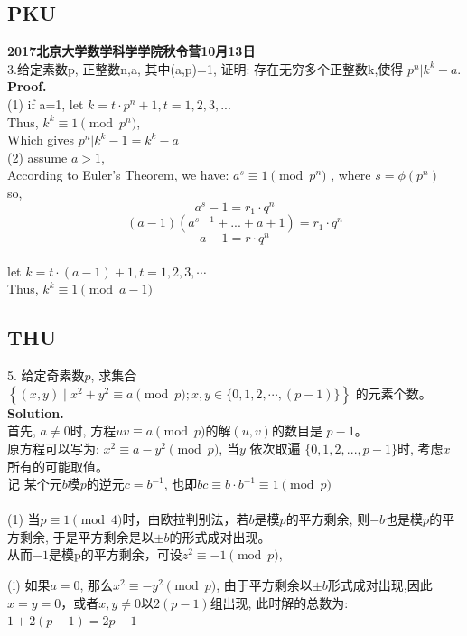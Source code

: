 \documentclass[11pt,a4paper]{article}
\begin{document}
\subsection{PKU}
\begin{CJK}{UTF8}{gbsn}
	
\textbf{2017北京大学数学科学学院秋令营10月13日}
\\
3.给定素数p, 正整数n,a, 其中(a,p)=1, 证明: 存在无穷多个正整数k,使得 $p^n|k^k-a$.\\
\textbf{Proof.}\\
(1) if a=1, let $k=t\cdot p^n + 1,t=1,2,3,...$\\
Thus, $k^k\equiv 1 \pmod{p^n}$,   \\
Which gives $p^n|k^k-1=k^k-a$  \\
(2) assume $a>1$, \\
According to Euler's Theorem, we have: $a^s \equiv 1 \pmod{p^n}$ , where $s=\phi{(p^n)}$\\
so, $$a^s-1 = r_1\cdot q^n$$
$$ (a-1)(a^{s-1}+...+a+1) = r_1\cdot q^n$$
$$a-1=r\cdot q^n$$
\\
let $k=t\cdot (a-1) + 1, t=1,2,3,\cdots $\\
Thus, $k^k \equiv 1 \pmod{a-1}$ \\
$$ $$
\newpage
\subsection{THU}
5. 给定奇素数$p$, 求集合$\left\{(x,y)\mid x^2+y^2 \equiv a \pmod{p}; x,y\in \{0,1,2,\cdots ,(p-1)\} \right\}$ 的元素个数。
\\
\textbf{Solution.} \\
首先, $a\ne 0$时, 方程$uv\equiv a \pmod p $的解$(u,v)$的数目是 $p-1$。\\
原方程可以写为: $x^2 \equiv a-y^2 \pmod{p}$, 当$y$ 依次取遍 $\{0,1,2,...,p-1\}$时, 考虑$x$所有的可能取值。\\
记 某个元$b$模$p$的逆元$c=b^{-1}$, 也即$bc\equiv b\cdot b^{-1}\equiv1\pmod{p}$\\
\\
(1) 当$p\equiv1 \pmod{4}$时，由欧拉判别法，若$b$是模$p$的平方剩余, 则$-b$也是模$p$的平方剩余, 于是平方剩余是以$\pm b$的形式成对出现。\\
从而$-1$是模p的平方剩余，可设$z^2\equiv -1 \pmod{p}$, 

(i) 如果$a=0$, 那么$x^2\equiv -y^2 \pmod{p}$, 由于平方剩余以$\pm b$形式成对出现,因此$x=y=0$，或者$x,y\ne 0$以$2(p-1)$组出现,
此时解的总数为: $1+2(p-1)=2p-1$


\end{CJK}
\end{document}
